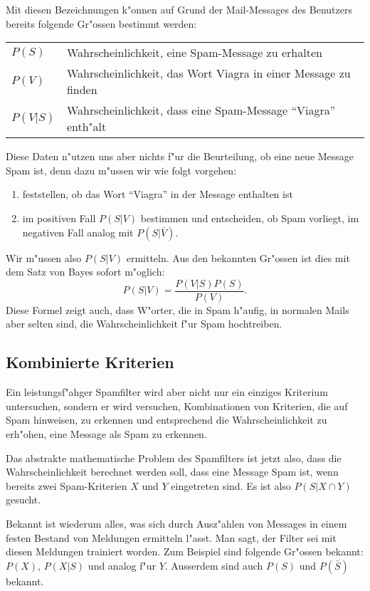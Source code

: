 Mit diesen Bezeichnungen k"onnen auf Grund der Mail-Messages des Benutzers
bereits folgende Gr"ossen bestimmt werden:
\begin{center}
\begin{tabular}{ll}
$P(S)$&Wahrscheinlichkeit, eine Spam-Message zu erhalten\\
$P(V)$&Wahrscheinlichkeit, das Wort Viagra in einer Message zu finden\\
$P(V|S)$&Wahrscheinlichkeit, dass eine Spam-Message ``Viagra'' enth"alt\\
\end{tabular}
\end{center}
Diese Daten n"utzen uns aber nichts f"ur die Beurteilung, ob eine neue
Message Spam ist, denn dazu m"ussen wir wie folgt vorgehen:
\begin{enumerate}
\item feststellen, ob das Wort ``Viagra'' in der Message enthalten ist
\item im positiven Fall $P(S|V)$ bestimmen und entscheiden, ob Spam vorliegt,
im negativen Fall analog mit $P(S|\bar V)$.
\end{enumerate}
Wir m"ussen also $P(S|V)$ ermitteln. Aus den bekannten Gr"ossen ist dies
mit dem Satz von Bayes sofort m"oglich:
\begin{equation}
P(S|V)=\frac{P(V|S)P(S)}{P(V)}.
\end{equation}
Diese Formel zeigt auch, dass W"orter, die in Spam h"aufig, in normalen
Mails aber selten sind, die Wahrscheinlichkeit f"ur Spam hochtreiben.

\subsection{Kombinierte Kriterien}
Ein leistungsf"ahger Spamfilter wird aber nicht nur ein einziges Kriterium
untersuchen, sondern er wird versuchen, Kombinationen von Kriterien, die
auf Spam hinweisen, zu erkennen und entsprechend die Wahrscheinlichkeit
zu erh"ohen, eine Message als Spam zu erkennen.

Das abstrakte mathematische Problem des Spamfilters ist jetzt also,
dass die Wahrscheinlichkeit berechnet werden soll, dass eine Message
Spam ist, wenn bereits zwei Spam-Kriterien $X$ und $Y$ eingetreten
sind. Es ist also $P(S|X\cap Y)$ gesucht.

Bekannt ist wiederum alles, was sich durch Ausz"ahlen von Messages
in einem festen Bestand von Meldungen ermitteln l"asst. Man sagt,
der Filter sei mit diesen Meldungen trainiert worden. Zum Beispiel
sind folgende Gr"ossen bekannt: $P(X)$, $P(X|S)$ und analog f"ur $Y$.
Ausserdem sind auch $P(S)$ und $P(\bar S)$ bekannt.

